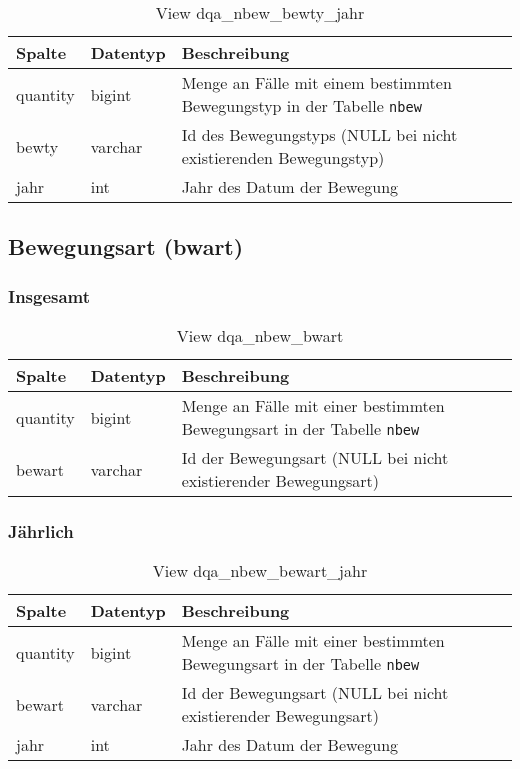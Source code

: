 \begin{table}[ht]
	\centering   
	\caption{View dqa\_nbew\_bewty\_jahr}
	\label{tab:bewBtyJ}
	\begin{tabular}{||l|l|p{10cm}||}   		
		\hline
		Spalte & Datentyp & Beschreibung \\ [0.5ex]
		\hline\hline
		quantity & bigint & Menge an Fälle mit einem bestimmten Bewegungstyp in der Tabelle \texttt{nbew}\\
		\hline
		bewty & varchar & Id des Bewegungstyps (NULL bei nicht existierenden Bewegungstyp)\\
		\hline
		jahr & int &  Jahr des Datum der Bewegung \\
		\hline		
	\end{tabular}
\end{table}

\subsection{Bewegungsart (bwart)} \label{subsec:bewart}

\subsubsection{Insgesamt} \label{subsubsec:bewartI}

\begin{table}[ht]
	\centering   
	\caption{View dqa\_nbew\_bwart}
	\label{tab:bewArtI}
	\begin{tabular}{||l|l|p{10cm}||}   		
		\hline
		Spalte & Datentyp & Beschreibung \\ [0.5ex]
		\hline\hline
		quantity & bigint & Menge an Fälle mit einer bestimmten Bewegungsart in der Tabelle \texttt{nbew} \\
		\hline
		bewart & varchar & Id der Bewegungsart (NULL bei nicht existierender Bewegungsart)\\
		\hline
		
	\end{tabular}
\end{table}

\newpage

\subsubsection{Jährlich} \label{subsubsec:bewartJ}

\begin{table}[ht]
	\centering   
	\caption{View dqa\_nbew\_bewart\_jahr}
	\label{tab:bewArtJ}
	\begin{tabular}{||l|l|p{10cm}||}   		
		\hline
		Spalte & Datentyp & Beschreibung \\ [0.5ex]
		\hline\hline
		quantity & bigint & Menge an Fälle mit einer bestimmten Bewegungsart in der Tabelle \texttt{nbew}\\
		\hline
		bewart & varchar & Id der Bewegungsart (NULL bei nicht existierender Bewegungsart)\\
		\hline
		jahr & int &  Jahr des Datum der Bewegung \\
		\hline		
	\end{tabular}
\end{table}

